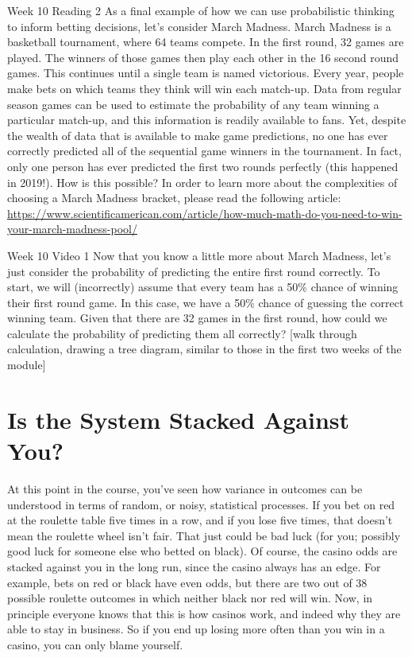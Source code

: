 \documentclass[]{book}
\begin{document}
Week 10 Reading 2
As a final example of how we can use probabilistic thinking to inform betting decisions, let's consider March Madness. March Madness is a basketball tournament, where 64 teams compete. In the first round, 32 games are played. The winners of those games then play each other in the 16 second round games. This continues until a single team is named victorious. Every year, people make bets on which teams they think will win each match-up. Data from regular season games can be used to estimate the probability of any team winning a particular match-up, and this information is readily available to fans. Yet, despite the wealth of data that is available to make game predictions, no one has ever correctly predicted all of the sequential game winners in the tournament. In fact, only one person has ever predicted the first two rounds perfectly (this happened in 2019!). How is this possible? In order to learn more about the complexities of choosing a March Madness bracket, please read the following article: \url{https://www.scientificamerican.com/article/how-much-math-do-you-need-to-win-your-march-madness-pool/}

Week 10 Video 1
Now that you know a little more about March Madness, let's just consider the probability of predicting the entire first round correctly. To start, we will (incorrectly) assume that every team has a 50\% chance of winning their first round game. In this case, we have a 50\% chance of guessing the correct winning team. Given that there are 32 games in the first round, how could we calculate the probability of predicting them all correctly? {[}walk through calculation, drawing a tree diagram, similar to those in the first two weeks of the module{]}

\hypertarget{is-the-system-stacked-against-you}{%
\chapter{Is the System Stacked Against You?}\label{is-the-system-stacked-against-you}}

At this point in the course, you've seen how variance in outcomes can be understood in terms of random, or noisy, statistical processes. If you bet on red at the roulette table five times in a row, and if you lose five times, that doesn't mean the roulette wheel isn't fair. That just could be bad luck (for you; possibly good luck for someone else who betted on black). Of course, the casino odds are stacked against you in the long run, since the casino always has an edge. For example, bets on red or black have even odds, but there are two out of 38 possible roulette outcomes in which neither black nor red will win. Now, in principle everyone knows that this is how casinos work, and indeed why they are able to stay in business. So if you end up losing more often than you win in a casino, you can only blame yourself.
\end{document}
